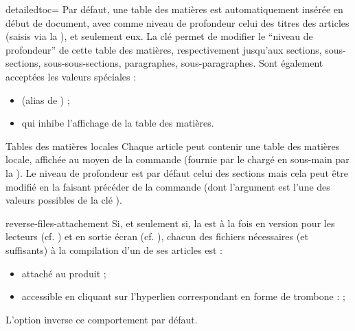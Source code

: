 \documentclass{letgut}
\begin{document}
{
  \begin{docKey}[][doc updated={2023-01-19}]{detailedtoc}{=\textbar{}\textbar{}\textbar{}\textbar{}}{}
    Par défaut, une table des matières est automatiquement insérée en début de
    document, avec comme niveau de profondeur celui des titres des articles
    (saisis via la ), et seulement eux.  La clé 
    permet de modifier le \enquote{niveau de profondeur} de cette table des
    matières, respectivement jusqu'aux sections, sous-sections,
    sous-sous-sections, paragraphes, sous-paragraphes. Sont également acceptées
    les valeurs spéciales :
    \begin{itemize}
    \item {} (alias de ) ;
    \item {} qui inhibe l'affichage de la table des matières.
    \end{itemize}

    \begin{dbremark}{Tables des matières locales}{}
      Chaque article peut contenir une table des matières locale, affichée au
      moyen de la commande  (fournie par le
       chargé en sous-main par la ). Le niveau de
      profondeur est par défaut celui des sections mais cela peut être modifié en
      la faisant précéder de la commande  (dont
      l'argument est l'une des valeurs possibles de la clé ).
    \end{dbremark}
  \end{docKey}
}

\begin{docKey}[][doc new={2023-01-14}]{reverse-files-attachement}{}{}
  Si, et seulement si, la  est à la fois en version pour les lecteurs
  (cf. ) et en sortie écran (cf. ), chacun
  des fichiers nécessaires (et suffisants) à la compilation d'un de ses articles
  est :
  \begin{itemize}
  \item attaché au \pdf{} produit ;
  \item accessible en cliquant sur l'hyperlien correspondant en forme de
    trombone : \noattachfile[icon=Paperclip] ;
  \end{itemize}
  L'option  inverse ce comportement par
  défaut.
\end{docKey}
\end{document}
